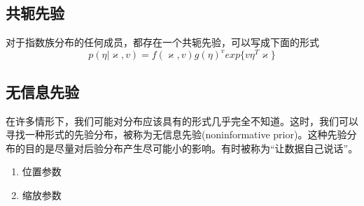 \subsection*{共轭先验}
对于指数族分布的任何成员，都存在一个共轭先验，可以写成下面的形式
\begin{equation}
	p(\eta|\varkappa ,v)=f(\varkappa,v)g(\eta)^vexp\{v\eta^T\varkappa \}
\end{equation}
\subsection*{无信息先验}
在许多情形下，我们可能对分布应该具有的形式几乎完全不知道。这时，我们可以寻找一种形式的先验分布，被称为无信息先验(noninformative prior)。这种先验分布的目的是尽量对后验分布产生尽可能小的影响。有时被称为“让数据自己说话”。
\begin{enumerate}
	\item 位置参数 
	\item 缩放参数 
\end{enumerate}
